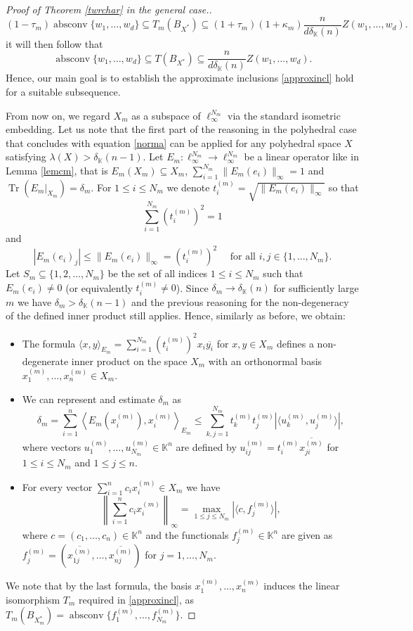 \documentclass[12pt, reqno]{amsart}
\theoremstyle{definition}
\theoremstyle{remark}
\numberwithin{equation}{section}
\DeclareMathOperator{\absconv}{absconv}
\DeclareMathOperator{\tr}{Tr}
\begin{document}
\begin{proof}[Proof of Theorem \ref{twrchar} in the general case.]
$$(1-\tau_m)\absconv \{w_1, \ldots, w_d\} \subseteq T_m(B_{X^*}) \subseteq (1+\tau_m)(1+\kappa_m) \frac{n}{d\delta_{\mathbb{K}}(n)} Z(w_1, \ldots, w_d).$$
it will then follow that
$$\absconv \{w_1, \ldots, w_d\} \subseteq T(B_{X^*}) \subseteq \frac{n}{d\delta_{\mathbb{K}}(n)} Z(w_1, \ldots, w_d).$$
Hence, our main goal is to establish the approximate inclusions \eqref{approxincl} hold for a suitable subsequence.

From now on, we regard $X_m$ as a subspace of $\ell_{\infty}^{N_m}$ via the standard isometric embedding. Let us note that the first part of the reasoning in the polyhedral case that concludes with equation \eqref{norma} can be applied for any polyhedral space $X$ satisfying $\lambda(X) > \delta_{\mathbb{K}}(n-1)$. Let $E_m: \ell_{\infty}^{N_m} \to \ell_{\infty}^{N_m}$ be a linear operator like in Lemma \ref{lemcm}, that is $E_m(X_m) \subseteq X_m$, $\sum_{i=1}^{N_m} \|E_m(e_i)\|_{\infty} = 1$ and $\tr(E_m|_{X_m})=\delta_m$. For $1 \leq i \leq N_m$ we denote $t^{(m)}_i = \sqrt{\|E_m(e_i)\|_{\infty}}$ so that
$$\sum_{i=1}^{N_m} (t_i^{(m)})^2 = 1$$ 
and
$$|E_m(e_i)_j| \leq \|E_m(e_i)\|_{\infty} = (t^{(m)}_i)^2 \quad \text { for all } i, j \in \{1, \ldots, N_m\}.$$
Let $S_m \subseteq \{1, 2, \ldots, N_m\}$ be the set of all indices $1 \leq i \leq N_m$ such that $E_m(e_i) \neq 0$ (or equivalently $t^{(m)}_i \neq 0$). Since $\delta_m \to \delta_{\mathbb{K}}(n)$ for sufficiently large $m$ we have $\delta_m> \delta_{\mathbb{K}}(n-1)$ and the previous reasoning for the non-degeneracy of the defined inner product still applies. Hence, similarly as before, we obtain:
\begin{itemize}
\item The formula $\langle x, y \rangle_{E_m} = \sum_{i=1}^{N_m} (t_i^{(m)})^2 x_i \overline{y_i}$ for $x, y \in X_m$ defines a non-degenerate inner product on the space $X_m$ with an orthonormal basis $x_1^{(m)}, \ldots, x_n^{(m)} \in X_m$.
\item We can represent and estimate $\delta_m$ as 
$$\delta_m = \sum_{i=1}^{n} \left \langle E_m(x^{(m)}_i), x^{(m)}_i \right \rangle_{E_m} \leq \sum_{k, j=1}^{N_m} t^{(m)}_kt^{(m)}_j | \langle u_k^{(m)}, u_j^{(m)} \rangle |,$$
where vectors $u^{(m)}_1, \ldots, u^{(m)}_{N_m} \in \mathbb{K}^n$ are defined by $u^{(m)}_{ij}=t^{(m)}_i \overline{x^{(m)}_{ji}}$ for $1 \leq i \leq N_m$ and $1 \leq j \leq n$.
\item For every vector $\sum_{i=1}^{n} c_ix^{(m)}_i \in X_m$ we have 
$$\left \| \sum_{i=1}^{n} c_ix^{(m)}_i \right \|_{\infty} = \max_{1 \leq j \leq N_m} |\langle c, f^{(m)}_j \rangle|,$$
where $c=(c_1, \ldots, c_n) \in \mathbb{K}^n$ and the functionals $f^{(m)}_j \in \mathbb{K}^n$ are given as $f^{(m)}_j = \left ( \overline{x^{(m)}_{1j}}, \ldots, \overline{x^{(m)}_{nj}} \right )$ for $j=1, \ldots, N_m$.
\end{itemize}
We note that by the last formula, the basis $x_1^{(m)}, \ldots, x_n^{(m)}$ induces the linear isomorphism $T_m$ required in \eqref{approxincl}, as $T_m({B_{X^*_m}}) = \absconv\{f_1^{(m)},\ldots,f_{N_m}^{(m)}\}$.


\end{proof}
\end{document}

